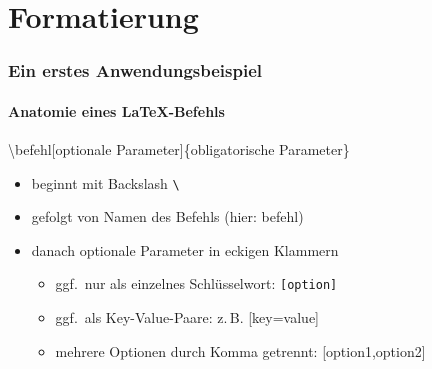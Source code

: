 \section{Formatierung}

\begin{frame}
    \frametitle{Ein erstes Anwendungsbeispiel}
    \framesubtitle{Anatomie eines \LaTeX-Befehls}

    \begin{center}
        \color{nounibaredI}\textbackslash befehl\color{nounibagreenI}[optionale Parameter]\color{black}\{obligatorische Parameter\}
    \end{center}

    \begin{itemize}
        \item beginnt mit Backslash \color{nounibaredI}\texttt{\textbackslash}\color{black}
        \item gefolgt von Namen des Befehls (hier: \color{nounibaredI}befehl\color{black})
        \item danach optionale Parameter in eckigen Klammern
            \begin{itemize}
                \item ggf.\ nur als einzelnes Schlüsselwort: \color{nounibagreenI}\texttt{[option]}\color{black}
                \item ggf.\ als Key-Value-Paare: z.\,B. \color{nounibagreenI}[key=value]\color{black}
                \item mehrere Optionen durch Komma getrennt: \color{nounibagreenI}[option1,option2]\color{black}
            \end{itemize}
    \end{itemize}
\end{frame}


